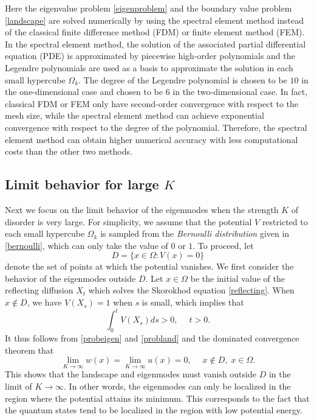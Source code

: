 \documentclass[a4paper,11pt]{article}
\begin{document}
Here the eigenvalue problem \eqref{eigenproblem} and the boundary value problem \eqref{landscape} are solved numerically by using the spectral element method instead of the classical finite difference method (FDM) or finite element method (FEM). In the spectral element method, the solution of the associated partial differential equation (PDE) is approximated by piecewise high-order polynomials and the Legendre polynomials are used as a basis to approximate the solution in each small hypercube $\Omega_k$. The degree of the Legendre polynomial is chosen to be $10$ in the one-dimensional case and chosen to be $6$ in the two-dimensional case. In fact, classical FDM or FEM only have second-order convergence with respect to the mesh size, while the spectral element method can achieve exponential convergence with respect to the degree of the polynomial. Therefore, the spectral element method can obtain higher numerical accuracy with less computational costs than the other two methods.

\subsection{Limit behavior for large $K$}
Next we focus on the limit behavior of the eigenmodes when the strength $K$ of disorder is very large. For simplicity, we assume that the potential $V$ restricted to each small hypercube $\Omega_k$ is sampled from the \emph{Bernoulli distribution} given in \eqref{bernoulli}, which can only take the value of $0$ or $1$. To proceed, let
\begin{equation*}
D = \{x \in \Omega: V(x) = 0\}
\end{equation*}
denote the set of points at which the potential vanishes. We first consider the behavior of the eigenmodes outside $D$. Let $x\in\Omega$ be the initial value of the reflecting diffusion $X_t$ which solves the Skorokhod equation \eqref{reflecting}. When $x \notin D$, we have $V(X_s) = 1$ when $s$ is small, which implies that
\begin{equation*}
\int_{0}^{t} V(X_s) ds > 0, \quad \; t > 0.
\end{equation*}
It thus follows from \eqref{probeigen} and \eqref{probland} and the dominated convergence theorem that
\begin{equation}\label{largeK}
\lim_{K \rightarrow \infty} w(x) = \lim_{K \rightarrow \infty} u(x) = 0, \quad \; x \notin D,\;x \in \Omega.
\end{equation}
This shows that the landscape and eigenmodes must vanish outside $D$ in the limit of $K\rightarrow\infty$. In other words, the eigenmodes can only be localized in the region where the potential attains its minimum. This corresponds to the fact that the quantum states tend to be localized in the region with low potential energy.
\end{document}
